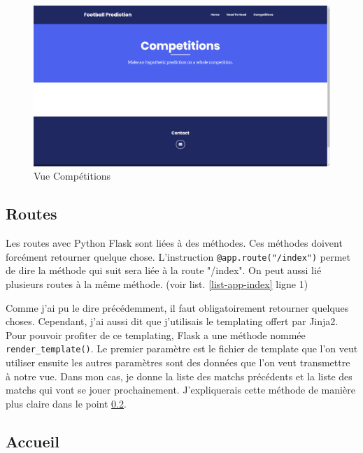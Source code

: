 \documentclass[a4paper,14pt]{extarticle}
\begin{document}
{


\begin{figure}[htp]
    \centering
    \includegraphics[width=15cm]{../img/apercuVueCompetitions.png}
    \caption{Vue Compétitions}
    \label{fig:vueCompetitions}
\end{figure}

\subsection{Routes}

Les routes avec Python Flask sont liées à des méthodes. Ces méthodes doivent forcément retourner quelque chose. L'instruction \texttt{@app.route("/index")} permet de dire la méthode qui suit sera liée à la route "/index". On peut aussi lié plusieurs routes à la même méthode. (voir list. \ref{list-app-index} ligne 1)


Comme j'ai pu le dire précédemment, il faut obligatoirement retourner quelques choses. Cependant, j'ai aussi dit que j'utilisais le templating offert par Jinja2. Pour pouvoir profiter de ce templating, Flask a une méthode nommée \texttt{render\_template()}. Le premier paramètre est le fichier de template que l'on veut utiliser ensuite les autres paramètres sont des données que l'on veut transmettre à notre vue. Dans mon cas, je donne la liste des matchs précédents et la liste des matchs qui vont se jouer prochainement. J'expliquerais cette méthode de manière plus claire dans le point \ref{flaskAccueil}.

\subsection{Accueil}
\label{flaskAccueil}

}
\end{document}
